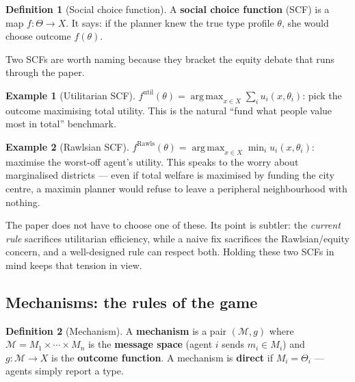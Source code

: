 \documentclass[11pt,letterpaper]{article}
\theoremstyle{definition}
\newtheorem{definition}{Definition}[section]
\newtheorem{example}{Example}[section]
\theoremstyle{plain}
\theoremstyle{remark}
\newcommand{\type}{\theta}
\newcommand{\typespace}{\Theta}
\newcommand{\outcomes}{X}
\newcommand{\scf}{f}
\DeclareMathOperator*{\argmax}{arg\,max}
\begin{document}
\begin{definition}[Social choice function]
\label{def:scf}
A \textbf{social choice function} (SCF) is a map $\scf:\typespace\to\outcomes$. It says: if the
planner knew the true type profile $\type$, she would choose outcome $\scf(\type)$.
\end{definition}

\noindent Two SCFs are worth naming because they bracket the equity debate that runs through
the paper.

\begin{example}[Utilitarian SCF]
\label{ex:util}
$\scf^{\text{util}}(\type)=\argmax_{x\in\outcomes}\sum_{i}u_i(x,\type_i)$: pick the outcome
maximising total utility. This is the natural ``fund what people value most in total'' benchmark.
\end{example}

\begin{example}[Rawlsian SCF]
\label{ex:rawls}
$\scf^{\text{Rawls}}(\type)=\argmax_{x\in\outcomes}\min_i u_i(x,\type_i)$: maximise the
worst-off agent's utility. This speaks to the worry about marginalised districts --- even if
total welfare is maximised by funding the city centre, a maximin planner would refuse to leave
a peripheral neighbourhood with nothing.
\end{example}

\begin{connection}
The paper does not have to choose one of these. Its point is subtler: the \emph{current rule}
sacrifices utilitarian efficiency, while a naive fix sacrifices the Rawlsian/equity concern,
and a well-designed rule can respect both. Holding these two SCFs in mind keeps that tension in
view.
\end{connection}

\subsection{Mechanisms: the rules of the game}

\begin{definition}[Mechanism]
\label{def:mechanism}
A \textbf{mechanism} is a pair $(\mathcal{M},g)$ where $\mathcal{M}=M_1\times\cdots\times M_n$
is the \textbf{message space} (agent $i$ sends $m_i\in M_i$) and $g:\mathcal{M}\to\outcomes$ is
the \textbf{outcome function}. A mechanism is \textbf{direct} if $M_i=\typespace_i$ --- agents
simply report a type.
\end{definition}
\end{document}
